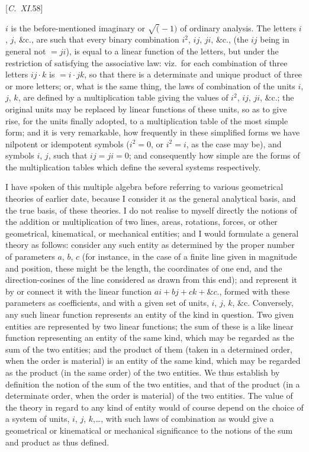 \documentclass[12pt,a4paper,oneside]{book}
\newcommand{\paperref}[1]{\par\noindent\hfill[#1]\hfill\null\par}
\begin{document}
\paperref{\textit{C.~XI.}\hfill 58}
\newpage
$i$ is the before-mentioned imaginary or $\surd(-1)$ of ordinary analysis. The letters $i$, $j$, \&c., are such that every binary combination $i^{2}$, $ij$, $ji$, \&c., (the $ij$ being in general not $=ji$), is equal to a linear function of the letters, but under the restriction of satisfying the associative law: viz.\ for each combination of three letters $ij\cdot k$ is $=i\cdot jk$, so that there is a determinate and unique product of three or more letters; or, what is the same thing, the laws of combination of the units $i$, $j$, $k$, are defined by a multiplication table giving the values of $i^{2}$, $ij$, $ji$, \&c.; the original units may be replaced by linear functions of these units, so as to give rise, for the units finally adopted, to a multiplication table of the most simple form; and it is very remarkable, how frequently in these simplified forms we have nilpotent or idempotent symbols ($i^{2}=0$, or $i^{2}=i$, as the case may be), and symbols $i$, $j$, such that $ij=ji=0$; and consequently how simple are the forms of the multiplication tables which define the several systems respectively.

I have spoken of this multiple algebra before referring to various geometrical theories of earlier date, because I consider it as the general analytical basis, and the true basis, of these theories. I do not realise to myself directly the notions of the addition or multiplication of two lines, areas, rotations, forces, or other geometrical, kinematical, or mechanical entities; and I would formulate a general theory as follows: consider any such entity as determined by the proper number of parameters $a$, $b$, $c$ (for instance, in the case of a finite line given in magnitude and position, these might be the length, the coordinates of one end, and the direction-cosines of the line considered as drawn from this end); and represent it by or connect it with the linear function $ai+bj+ck+\&c.$, formed with these parameters as coefficients, and with a given set of units, $i$, $j$, $k$, \&c. Conversely, any such linear function represents an entity of the kind in question. Two given entities are represented by two linear functions; the sum of these is a like linear function representing an entity of the same kind, which may be regarded as the sum of the two entities; and the product of them (taken in a determined order, when the order is material) is an entity of the same kind, which may be regarded as the product (in the same order) of the two entities. We thus establish by definition the notion of the sum of the two entities, and that of the product (in a determinate order, when the order is material) of the two entities. The value of the theory in regard to any kind of entity would of course depend on the choice of a system of units, $i$, $j$, $k$,\dots, with such laws of combination as would give a geometrical or kinematical or mechanical significance to the notions of the sum and product as thus defined.
\end{document}
